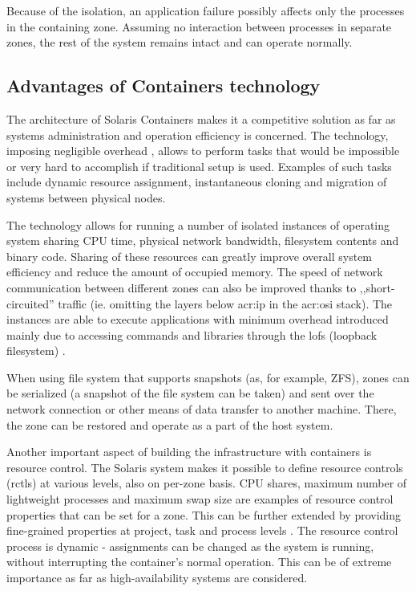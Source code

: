 \documentclass[11pt,openany]{book}
\begin{document}
        Because of the isolation, an application failure possibly affects only the processes in the containing zone.
        Assuming no interaction between processes in separate zones, the rest of the system remains intact and can
        operate normally.
      

      \subsection{Advantages of Containers technology}
      \label{sub:}

        The architecture of Solaris Containers makes it a competitive solution as far as systems administration and
        operation efficiency is concerned. The technology, imposing negligible overhead \cite{price}, allows to perform
        tasks that would be impossible or very hard to accomplish if traditional setup is used. Examples of such tasks
        include dynamic resource assignment, instantaneous cloning and migration of systems between physical nodes.

        The technology allows for running a number of isolated instances of operating system sharing CPU time, physical
        network bandwidth, filesystem contents and binary code. Sharing of these resources can greatly improve overall
        system efficiency and reduce the amount of occupied memory. The speed of network communication between different
        zones can also be improved thanks to ,,short-circuited'' traffic (ie. omitting the layers below \gls{acr:ip} in
        the \gls{acr:osi} stack). The instances are able to execute applications with minimum overhead introduced mainly
        due to accessing commands and libraries through the lofs (loopback filesystem) \cite{price,fsag}.

        When using file system that supports snapshots (as, for example, ZFS), zones can be serialized (a snapshot of
        the file system can be taken) and sent over the network connection or other means of data transfer to another
        machine. There, the zone can be restored and operate as a part of the host system.

        Another important aspect of building the infrastructure with containers is resource control. The Solaris system
        makes it possible to define resource controls (rctls) at various levels, also on per-zone basis. CPU shares,
        maximum number of lightweight processes and maximum swap size are examples of resource control properties that
        can be set for a zone. This can be further extended by providing fine-grained properties at project, task and
        process levels \cite{sag}. The resource control process is dynamic - assignments can be changed as the system is
        running, without interrupting the container's normal operation. This can be of extreme importance as far as
        high-availability systems are considered.
\end{document}
